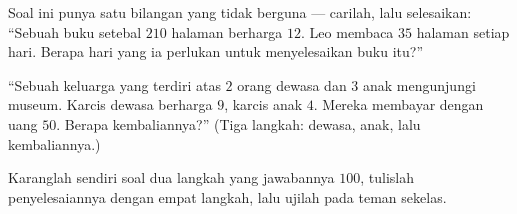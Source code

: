 \begin{exercise}[$\star$]\label{exo:g3:problems:9}
Soal ini punya satu bilangan yang tidak berguna --- carilah, lalu
selesaikan: ``Sebuah buku setebal $210$ halaman berharga $12$. Leo
membaca $35$ halaman setiap hari. Berapa hari yang ia perlukan untuk menyelesaikan buku itu?''
\end{exercise}

\begin{exercise}[$\star\star$]\label{exo:g3:problems:10}
``Sebuah keluarga yang terdiri atas $2$ orang dewasa dan $3$ anak
mengunjungi museum. Karcis dewasa berharga $9$, karcis anak $4$.
Mereka membayar dengan uang $50$. Berapa kembaliannya?'' (Tiga
langkah: dewasa, anak, lalu kembaliannya.)
\end{exercise}

\begin{exercise}[$\star\star$]\label{exo:g3:problems:11}
Karanglah sendiri soal dua langkah yang jawabannya $100$, tulislah
penyelesaiannya dengan empat langkah, lalu ujilah pada teman sekelas.

\end{exercise}
